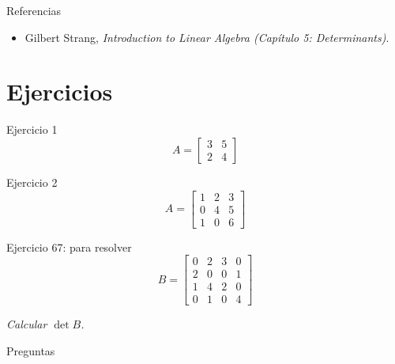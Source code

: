 \documentclass[aspectratio=169,11pt]{beamer}
\newcommand{\dt}[1]{\det #1}
\newcommand{\mat}[1]{%
  \begin{bmatrix} #1 \end{bmatrix}%
}
\newcommand{\remate}[1]{%
  \vspace{0.3em}
  \begin{center}\itshape\small #1\end{center}%
}
\begin{document}
\begin{frame}{Referencias}

    \begin{itemize}
      \item Gilbert Strang, \emph{Introduction to Linear Algebra (Capítulo 5: Determinants)}.
    \end{itemize}


\end{frame}

\section{Ejercicios}

\begin{frame}{Ejercicio 1}
  \[
    A = \mat{3 & 5 \\ 2 & 4}
  \]

\end{frame}

\begin{frame}{Ejercicio 2}
  \[
    A = \mat{1 & 2 & 3 \\ 0 & 4 & 5 \\ 1 & 0 & 6}
  \]


\end{frame}

\begin{frame}{Ejercicio 67: para resolver}
  \[
    B = \mat{0 & 2 & 3 & 0 \\
             2 & 0 & 0 & 1 \\
             1 & 4 & 2 & 0 \\
             0 & 1 & 0 & 4}
  \]

  \remate{Calcular $\dt{B}$.}

\end{frame}

\begin{frame}[standout]
  Preguntas 
\end{frame}

\end{document}
